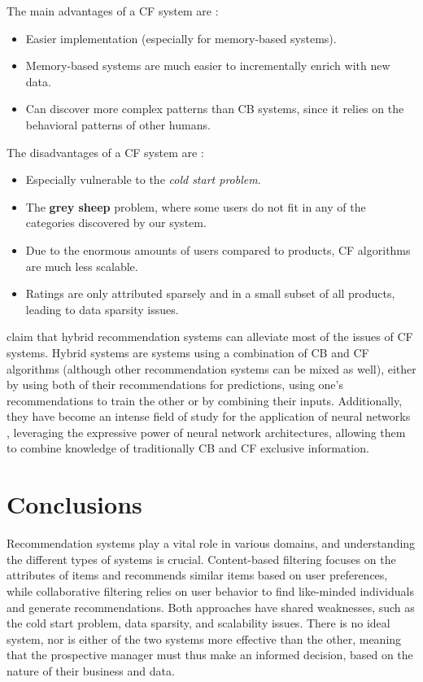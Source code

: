 \documentclass[12pt, a4paper]{article}
\begin{document}
The main advantages of a CF system are \cite{survey1, survey2}:
\begin{itemize}
    \item Easier implementation (especially for memory-based systems).
    \item Memory-based systems are much easier to incrementally enrich with new data.
    \item Can discover more complex patterns than CB systems, since it relies on the behavioral patterns of other humans. 
\end{itemize}

The disadvantages of a CF system are \cite{survey1, survey2}:
\begin{itemize}
    \item Especially vulnerable to the \textit{cold start problem}.
    \item The \textbf{grey sheep} problem, where some users do not fit in any of the categories discovered by our system.
    \item Due to the enormous amounts of users compared to products, CF algorithms are much less scalable.
    \item Ratings are only attributed sparsely and in a small subset of all products, leading to data sparsity issues.
\end{itemize}

\textcite{comparison1} claim that hybrid recommendation systems can alleviate most of the issues of CF systems. Hybrid systems are systems using a combination of CB and CF algorithms (although other recommendation systems can be mixed as well), either by using both of their recommendations for predictions, using one's recommendations to train the other or by combining their inputs. Additionally, they have become an intense field of study for the application of neural networks \cite{nn1}, leveraging the expressive power of neural network architectures, allowing them to combine knowledge of traditionally CB and CF exclusive information.


\section{Conclusions}

Recommendation systems play a vital role in various domains, and understanding the different types of systems is crucial. Content-based filtering focuses on the attributes of items and recommends similar items based on user preferences, while collaborative filtering relies on user behavior to find like-minded individuals and generate recommendations. Both approaches have shared weaknesses, such as the cold start problem, data sparsity, and scalability issues. There is no ideal system, nor is either of the two systems more effective than the other, meaning that the prospective manager must thus make an informed decision, based on the nature of their business and data. 

\printbibliography
\end{document}
